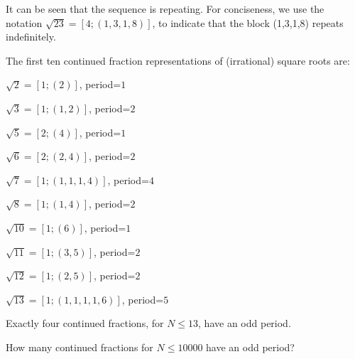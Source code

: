 It can be seen that the sequence is repeating. For conciseness, we use the notation $\sqrt{23} = [4;(1,3,1,8)]$, to
indicate that the block (1,3,1,8) repeats indefinitely.

The first ten continued fraction representations of (irrational) square roots are:

$\sqrt{2} = [1;(2)]$, period=$1$

$\sqrt{3} = [1;(1, 2)]$, period=$2$

$\sqrt{5} = [2;(4)]$, period=$1$

$\sqrt{6} = [2;(2,4)]$, period=$2$

$\sqrt{7} = [1;(1,1,1,4)]$, period=$4$

$\sqrt{8} = [1;(1,4)]$, period=$2$

$\sqrt{10} = [1;(6)]$, period=$1$

$\sqrt{11} = [1;(3, 5)]$, period=$2$

$\sqrt{12} = [1;(2,5)]$, period=$2$

$\sqrt{13} = [1;(1,1,1,1,6)]$, period=$5$

Exactly four continued fractions, for $N \le 13$, have an odd period.

How many continued fractions for $N \le 10 000$ have an odd period?

